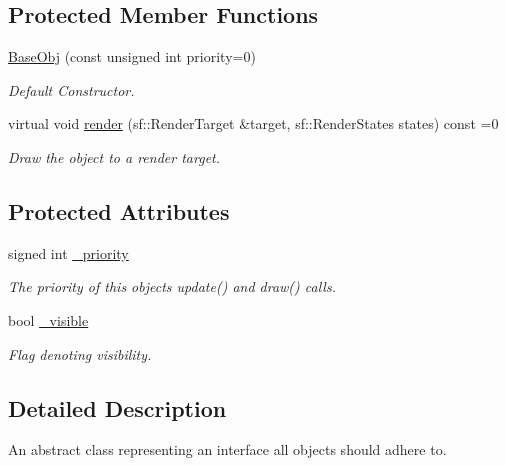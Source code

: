 \subsection*{Protected Member Functions}
\begin{DoxyCompactItemize}
\item 
\hyperlink{classhelios_1_1_base_obj_a2643236c24e9292ff696e3e13bb20c63}{Base\+Obj} (const unsigned int priority=0)
\begin{DoxyCompactList}\small\item\em Default Constructor. \end{DoxyCompactList}\item 
virtual void \hyperlink{classhelios_1_1_base_obj_ac9b5f84814f4e12a8b145fcdc9289189}{render} (sf\+::\+Render\+Target \&target, sf\+::\+Render\+States states) const  =0
\begin{DoxyCompactList}\small\item\em Draw the object to a render target. \end{DoxyCompactList}\end{DoxyCompactItemize}
\subsection*{Protected Attributes}
\begin{DoxyCompactItemize}
\item 
signed int \hyperlink{classhelios_1_1_base_obj_aa770e0799b9c82837fd40fbe80eb15e3}{\+\_\+priority}
\begin{DoxyCompactList}\small\item\em The priority of this object\textquotesingle{}s update() and draw() calls. \end{DoxyCompactList}\item 
bool \hyperlink{classhelios_1_1_base_obj_ab614fbf556382cdfb8c09fc0215db281}{\+\_\+visible}
\begin{DoxyCompactList}\small\item\em Flag denoting visibility. \end{DoxyCompactList}\end{DoxyCompactItemize}


\subsection{Detailed Description}
An abstract class representing an interface all objects should adhere to. 

